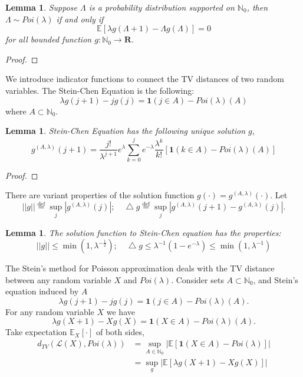 \documentclass[11pt,english]{smfart}
\newcommand{\defeq}{\overset{\mathrm{def}}{=}}
\newtheorem{lemma}[theorem]{Lemma}
\newcommand{\mb}{\mathbb}
\newcommand{\mf}{\mathbf}
\begin{document}
\begin{lemma}
    Suppose $\Lambda$ is a probability distribution supported on $\mathbb{N}_0$, then $\Lambda \sim Poi(\lambda)$ if and only if
    $$\mb{E}\left[\lambda g(\Lambda+1) - \Lambda g(\Lambda)\right] = 0$$
    for all bounded function $g:\mb{N}_0 \rightarrow \mf{R}$.
\end{lemma}
\begin{proof}
    
\end{proof}
We introduce indicator functions to connect the TV distances of two random variables. The Stein-Chen Equation is the following:
$$\lambda g(j+1) - jg(j) = \mf{1}(j\in A) - Poi(\lambda)(A)$$
where $A \subset \mb{N}_0$. \\
\begin{lemma}
    Stein-Chen Equation has the following unique solution $g$,
    $$g^{(A,\lambda)}(j+1) = \frac{j!}{\lambda^{j+1}}e^{\lambda}\sum_{k=0}^j e^{-\lambda}\frac{\lambda^k}{k!}\left[\mf{1}(k\in A) - Poi(\lambda)(A)\right]$$
\end{lemma}
\begin{proof}
    
\end{proof}

There are variant properties of the solution function $g(\cdot) = g^{(A,\lambda)}(\cdot)$. Let $$||g||\defeq \sup_{j}|g^{(A,\lambda)}(j)|;\quad \bigtriangleup  g \defeq \sup_{j} |g^{(A,\lambda)}(j+1) - g^{(A,\lambda)}(j)|.$$

\begin{lemma}
    The solution function to Stein-Chen equation has the properties:
    $$||g|| \leq \min(1,\lambda^{-\frac{1}{2}});\quad \bigtriangleup g \leq \lambda^{-1}(1-e^{-\lambda}) \leq \min(1,\lambda^{-1})$$
\end{lemma}

The Stein's method for Poisson approximation deals with the TV distance between any random variable $X$ and $Poi(\lambda)$. Consider sets $A\subset \mb{N}_0$, and Stein's equation induced by $A$
$$\lambda g(j+1) - jg(j) = \mf{1}(j\in A) - Poi(\lambda)(A).$$
For any random variable $X$ we have 
$$\lambda g(X+1) - Xg(X) = \mf{1}(X \in A) - Poi(\lambda)(A).$$
Take expectation $\mb{E}_X[\cdot]$ of both sides,
\begin{align*}
    d_{TV}(\mathcal{L}(X),Poi(\lambda)) &= \sup_{A\in \mb{N}_0} \left|\mb{E}\left[\mf{1}(X\in A) - Poi(\lambda)\right]\right|\\
    &= \sup_g \left|\mb{E}[\lambda g(X+1) - Xg(X)]\right|
\end{align*}
\end{document}
